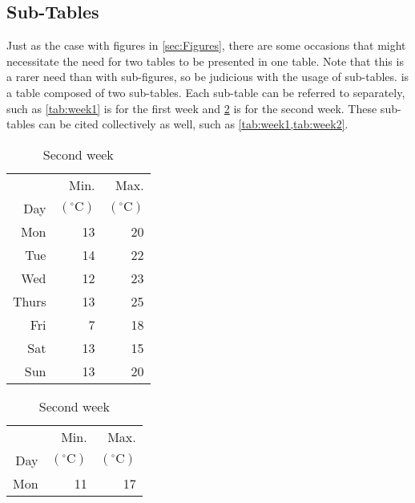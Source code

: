 \subsection{Sub-Tables}
    Just as the case with figures in \cref{sec:Figures}, there are some occasions that might necessitate the need for two tables to be presented in one table.
    Note that this is a rarer need than with sub-figures, so be judicious with the usage of sub-tables.
     is a table composed of two sub-tables.
    Each sub-table can be referred to separately, such as \cref{tab:week1} is for the first week and \cref{tab:week2} is for the second week.
    These sub-tables can be cited collectively as well, such as \cref{tab:week1,tab:week2}.
    \begin{table}
        \begin{subtable}[h]{0.325\textwidth}
            \centering
            \caption{First week}
            \label{tab:week1}
            \begin{tabular}{r r r}
                      & Min.  & Max. \\
                Day   & $\left(^\circ\text{C}\right)$
                              & $\left(^\circ\text{C}\right)$ \\
                \hline
                Mon   & 13 & 20 \\
                Tue   & 14 & 22 \\
                Wed   & 12 & 23 \\
                Thurs & 13 & 25 \\
                Fri   & 7  & 18 \\
                Sat   & 13 & 15 \\
                Sun   & 13 & 20 \\
                \hline
            \end{tabular}
        \end{subtable}
        \hspace{0.2in}
        \begin{subtable}[h]{0.325\textwidth}
            \caption{Second week}
            \label{tab:week2}
            \centering
            \begin{tabular}{r r r}
                      & Min.  & Max. \\
                Day   & $\left(^\circ\text{C}\right)$
                              & $\left(^\circ\text{C}\right)$ \\
                \hline
                Mon   & 11 & 17 \\

\end{tabular}
\end{subtable}
\end{table}
